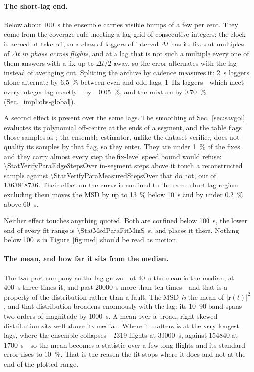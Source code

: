 \begin{revblock}
\paragraph{The short-lag end.}
Below about \SI{100}{\second} the ensemble carries visible bumps of a few per cent. They
come from the coverage rule meeting a lag grid of consecutive integers: the clock is
zeroed at take-off, so a class of loggers of interval $\Delta t$ has its fixes at
multiples of $\Delta t$ \emph{in phase across flights}, and at a lag that is not such a
multiple every one of them answers with a fix up to $\Delta t/2$ away, so the error
alternates with the lag instead of averaging out. Splitting the archive by cadence
measures it: \SI{2}{\second} loggers alone alternate by \SI{6.5}{\percent} between even
and odd lags, \SI{1}{\hertz} loggers---which meet every integer lag exactly---by
\SI{-0.05}{\percent}, and the mixture by \SI{0.70}{\percent}
(Sec.~\ref{impl:obs-global}).

A second effect is present over the same lags. The smoothing of Sec.~\ref{sec:savgol}
evaluates its polynomial off-centre at the ends of a segment, and the table flags those
samples as ; the ensemble estimator, unlike the dataset verifier, does not
qualify its samples by that flag, so they enter. They are under \SI{1}{\percent} of the
fixes and they carry almost every step the fix-level speed bound would refuse:
\num{\StatVerifyParaEdgeStepsOver} in-segment steps above it touch a reconstructed sample
against \num{\StatVerifyParaMeasuredStepsOver} that do not, out of
\num{1363818736}. Their effect on the curve is confined to the same short-lag region:
excluding them moves the MSD by up to \SI{13}{\percent} below \SI{10}{\second} and by
under \SI{0.2}{\percent} above \SI{60}{\second}.

Neither effect touches anything quoted. Both are confined below \SI{100}{\second}, the
lower end of every fit range is \SI{\StatMsdParaFitMinS}{\second}, and
 places it there. Nothing below \SI{100}{\second} in
Figure~\ref{fig:msd} should be read as motion.

\paragraph{The mean, and how far it sits from the median.}
The two part company as the lag grows---at \SI{40}{\second} the mean is the median, at
\SI{400}{\second} three times it, and past \SI{20000}{\second} more than ten times---and
that is a property of the distribution rather than a fault. The MSD \emph{is} the mean of
$|\mathbf{r}(t)|^2$, and that distribution broadens enormously with the lag: its 10--90
band spans two orders of magnitude by \SI{1000}{\second}. A mean over a broad,
right-skewed distribution sits well above its median. Where it matters is at the very
longest lags, where the ensemble collapses---\num{2319} flights at \SI{30000}{\second},
against \num{154840} at \SI{1700}{\second}---so the mean becomes a statistic over a few
long flights and its standard error rises to \SI{10}{\percent}. That is the reason the fit
stops where it does and not at the end of the plotted range.


\end{revblock}
